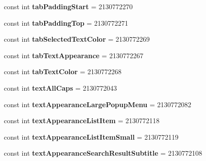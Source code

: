 \begin{DoxyCompactItemize}
const int {\bfseries tab\+Padding\+Start} = 2130772270
\item 
\mbox{\label{classXaria_1_1Resource_1_1Attribute_ae476bc4eeb1dd5921843fae2fdc4b0ca}} 
const int {\bfseries tab\+Padding\+Top} = 2130772271
\item 
\mbox{\label{classXaria_1_1Resource_1_1Attribute_a2a350175f4476cff0ae6305970e74d51}} 
const int {\bfseries tab\+Selected\+Text\+Color} = 2130772269
\item 
\mbox{\label{classXaria_1_1Resource_1_1Attribute_a5285f866bb41bc64fea5fc1f73c1b3b3}} 
const int {\bfseries tab\+Text\+Appearance} = 2130772267
\item 
\mbox{\label{classXaria_1_1Resource_1_1Attribute_a8d5e166a9816e8911237546bac2a36fb}} 
const int {\bfseries tab\+Text\+Color} = 2130772268
\item 
\mbox{\label{classXaria_1_1Resource_1_1Attribute_a2495c9a01c9a18847083019f0c2368bc}} 
const int {\bfseries text\+All\+Caps} = 2130772043
\item 
\mbox{\label{classXaria_1_1Resource_1_1Attribute_a2d1e2929e9c8f808870998d0bf868fbf}} 
const int {\bfseries text\+Appearance\+Large\+Popup\+Menu} = 2130772082
\item 
\mbox{\label{classXaria_1_1Resource_1_1Attribute_a6d26243f9da80708c3e113c9b73a83ca}} 
const int {\bfseries text\+Appearance\+List\+Item} = 2130772118
\item 
\mbox{\label{classXaria_1_1Resource_1_1Attribute_a208c3cc9e6cbd977cc66bbaec0fb2fec}} 
const int {\bfseries text\+Appearance\+List\+Item\+Small} = 2130772119
\item 
\mbox{\label{classXaria_1_1Resource_1_1Attribute_ae68eef8b751f1c98f47a79e22a9516c1}} 
const int {\bfseries text\+Appearance\+Search\+Result\+Subtitle} = 2130772108
\item 

\end{DoxyCompactItemize}
